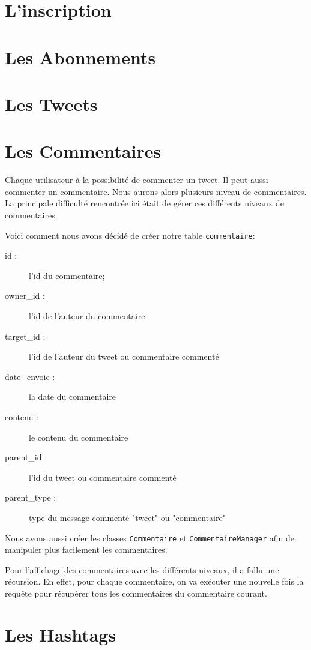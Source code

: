 \documentclass[a4paper, 12pt]{article}
\begin{document}
\section{L'inscription}	


\section{Les Abonnements}	


\section{Les Tweets}			


\section{Les Commentaires}	
Chaque utilisateur à la possibilité de commenter un tweet. Il peut aussi commenter un commentaire. Nous aurons alors plusieurs niveau de commentaires. La principale difficulté rencontrée ici était de gérer ces différents niveaux de commentaires.

Voici comment nous avons décidé de créer notre table \texttt{commentaire}:
\begin{description}
\item[id :] l'id du commentaire;
\item[owner\_id :] l'id de l'auteur du commentaire
\item[target\_id :] l'id de l'auteur du tweet ou commentaire commenté
\item[date\_envoie :] la date du commentaire
\item[contenu :] le contenu du commentaire
\item[parent\_id :] l'id du tweet ou commentaire commenté
\item[parent\_type :] type du message commenté "tweet" ou "commentaire"
\end{description}
Nous avons aussi créer les classes \texttt{Commentaire} et \texttt{CommentaireManager} afin de manipuler plus facilement les commentaires.

Pour l'affichage des commentaires avec les différents niveaux, il a fallu une récursion. En effet, pour chaque commentaire, on va exécuter une nouvelle fois la requête pour récupérer tous les commentaires du commentaire courant.

\section{Les Hashtags}		
\end{document}
